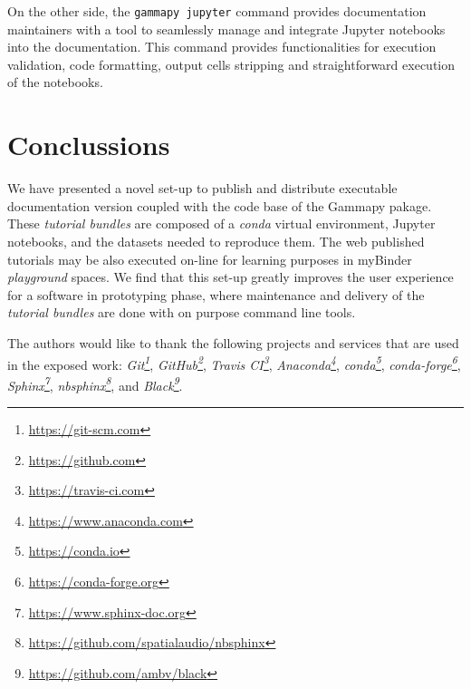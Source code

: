 \documentclass[11pt,twoside]{article}
\begin{document}
On the other side, the {\tt gammapy jupyter} command  provides documentation maintainers with a tool to seamlessly manage and integrate Jupyter notebooks into the documentation. This command provides functionalities for execution validation, code formatting, output cells stripping and straightforward execution of the notebooks. 



\section{Conclussions}
We have presented a novel set-up to publish and distribute executable documentation version coupled with the code base of the Gammapy pakage. These \textit{tutorial bundles} are composed of a \textit{conda} virtual environment, Jupyter notebooks, and the datasets needed to reproduce them. The web published tutorials may be also executed on-line for learning purposes in myBinder \textit{playground} spaces. We find that this set-up greatly improves the user experience for a software in prototyping phase, where maintenance and delivery of the \textit{tutorial bundles} are done with on purpose command line tools. 

\acknowledgements The authors would like to thank the following projects and services that are used in the exposed work:  \textit{Git\footnote{\url{https://git-scm.com}}}, \textit{GitHub\footnote{\url{https://github.com}}}, \textit{Travis CI\footnote{\url{https://travis-ci.com}}}, \textit{Anaconda\footnote{\url{https://www.anaconda.com}}}, \textit{conda\footnote{\url{https://conda.io}}}, \textit{conda-forge\footnote{\url{https://conda-forge.org}}}, \textit{Sphinx\footnote{\url{https://www.sphinx-doc.org}}}, \textit{nbsphinx\footnote{\url{https://github.com/spatialaudio/nbsphinx}}}, and \textit{Black\footnote{\url{https://github.com/ambv/black}}}.


\end{document}
